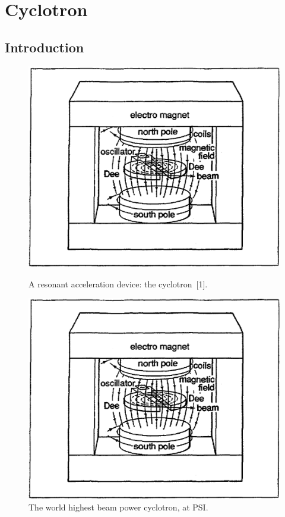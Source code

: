 



\chapter[Cyclotron]{Cyclotron}\label{chapCyclotron}


\section{Introduction \label{secCycloIntro}}

\begin{figure}[ht]
\centering
\sidebyside
{
    \includegraphics[width=0.45\linewidth]{./figs_cyclo/LBLCycloSketch.eps}
    \caption{A  resonant acceleration device: the cyclotron~[1].} %
\label{figLBLCycloSketch}
}{
    \includegraphics[width=0.45\linewidth]{./figs_cyclo/LBLCycloSketch.eps}
    \caption{     The world highest beam power cyclotron, at PSI.}
\label{figPSICyclo}
}
\end{figure}

